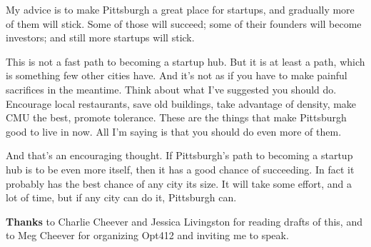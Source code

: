 My advice is to make Pittsburgh a great place for startups, and
gradually more of them will stick. Some of those will succeed; some of
their founders will become investors; and still more startups will
stick.

This is not a fast path to becoming a startup hub. But it is at least a
path, which is something few other cities have. And it's not as if you
have to make painful sacrifices in the meantime. Think about what I've
suggested you should do. Encourage local restaurants, save old
buildings, take advantage of density, make CMU the best, promote
tolerance. These are the things that make Pittsburgh good to live in
now. All I'm saying is that you should do even more of them.

And that's an encouraging thought. If Pittsburgh's path to becoming a
startup hub is to be even more itself, then it has a good chance of
succeeding. In fact it probably has the best chance of any city its
size. It will take some effort, and a lot of time, but if any city can
do it, Pittsburgh can.

\textbf{Thanks} to Charlie Cheever and Jessica Livingston for reading
drafts of this, and to Meg Cheever for organizing Opt412 and inviting me
to speak.
